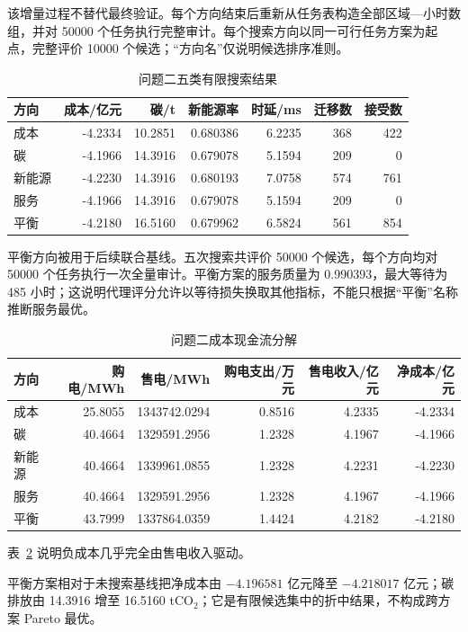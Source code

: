 \documentclass[withoutpreface,bwprint]{cumcmthesis}
\begin{document}
该增量过程不替代最终验证。每个方向结束后重新从任务表构造全部区域—小时数组，并对 50000 个任务执行完整审计。每个搜索方向以同一可行任务方案为起点，完整评价 10000 个候选；“方向名”仅说明候选排序准则。

\begin{table}[H]\centering
{\small
\caption{问题二五类有限搜索结果}\label{tab:q2schemes}
\begin{tabular}{lrrrrrr}\toprule
方向 & 成本/亿元 & 碳/t & 新能源率 & 时延/ms & 迁移数 & 接受数\\\midrule
成本 & -4.2334 & 10.2851 & 0.680386 & 6.2235 & 368 & 422\\
碳 & -4.1966 & 14.3916 & 0.679078 & 5.1594 & 209 & 0\\
新能源 & -4.2230 & 14.3916 & 0.680193 & 7.0758 & 574 & 761\\
服务 & -4.1966 & 14.3916 & 0.679078 & 5.1594 & 209 & 0\\
平衡 & -4.2180 & 16.5160 & 0.679962 & 6.5824 & 561 & 854\\\bottomrule
\end{tabular}
}
\end{table}

平衡方向被用于后续联合基线。五次搜索共评价 50000 个候选，每个方向均对 50000 个任务执行一次全量审计。平衡方案的服务质量为 0.990393，最大等待为 485 小时；这说明代理评分允许以等待损失换取其他指标，不能只根据“平衡”名称推断服务最优。

\begin{table}[H]\centering
{\small
\caption{问题二成本现金流分解}\label{tab:q2cost}
\begin{tabular}{lrrrrr}\toprule
方向 & 购电/MWh & 售电/MWh & 购电支出/万元 & 售电收入/亿元 & 净成本/亿元\\\midrule
成本 & 25.8055 & 1343742.0294 & 0.8516 & 4.2335 & -4.2334\\
碳 & 40.4664 & 1329591.2956 & 1.2328 & 4.1967 & -4.1966\\
新能源 & 40.4664 & 1339961.0855 & 1.2328 & 4.2231 & -4.2230\\
服务 & 40.4664 & 1329591.2956 & 1.2328 & 4.1967 & -4.1966\\
平衡 & 43.7999 & 1337864.0359 & 1.4424 & 4.2182 & -4.2180\\\bottomrule
\end{tabular}
}
\end{table}

表~\ref{tab:q2cost} 说明负成本几乎完全由售电收入驱动。

平衡方案相对于未搜索基线把净成本由 $-4.196581$ 亿元降至 $-4.218017$ 亿元；碳排放由 14.3916 增至 16.5160 tCO$_2$；它是有限候选集中的折中结果，不构成跨方案 Pareto 最优。
\end{document}
